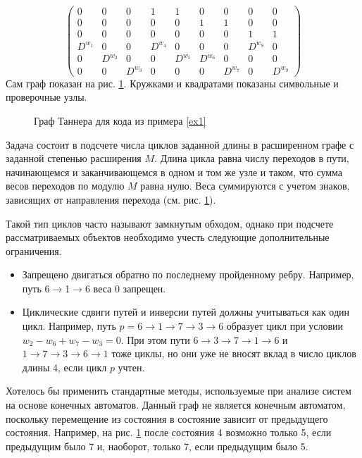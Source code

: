 \begin{example}
\[\begin{pmatrix}
0   &        0 &  0& 1 &1 & 0 &   0 &  0 &  0 \\
0   &        0 &  0& 0&0 & 1 &   1 &  0 &  0 \\
0   &        0 &  0& 0 &0 & 0 &   0 &  1 &  1 \\
D^{w_{1}}&   0   &  0  & D^{w_{4}}&0 &  0 & 0                   &   D^{w_{8}} & 0\\
0          &D^{w_{2}} &0  &0&D^{w_{5}}&  D^{w_{6}}          & 0          & 0&0\\
0 & 0& D^{w_{3}}      &0         &0      &  0   &  D^{w_{7}}& 0 &D^{w_{9}}
\end{pmatrix}                                                                                                                                           
\]
Сам граф показан на рис. \ref{fig1}. 
Кружками и квадратами показаны символьные и проверочные узлы. 
\begin{figure}[!h]
  \centering
   \caption{Граф Таннера для кода из примера \ref{ex1}}
  \label{fig1}
\end{figure}

\end{example}

Задача состоит в подсчете числа циклов заданной длины в расширенном 
графе с заданной степенью расширения $M$. Длина цикла равна числу переходов в 
пути, начинающемся и заканчивающемся  в одном и том же узле и таком, что 
сумма весов переходов по модулю $M$ равна нулю. 
Веса суммируются с учетом знаков, зависящих от направления 
перехода (см. рис. \ref{fig1}).

Такой тип циклов часто называют замкнутым обходом, однако при подсчете
рассматриваемых объектов необходимо учесть следующие дополнительные ограничения.
\begin{itemize}
\item
Запрещено двигаться обратно по последнему пройденному ребру. Например,
путь  6$\to$1$\to$6 веса 0 запрещен.
\item
Циклические сдвиги путей и инверсии путей должны  учитываться как один цикл. Например, путь
$p=6\to 1 \to 7\to 3 \to 6$  образует цикл при условии $w_2-w_6+w_7-w_3=0$. При этом пути
$6 \to 3 \to 7\to 1 \to 6$ и  $1\to 7 \to 3\to 6 \to 1$ тоже циклы, но они уже не вносят
вклад в число циклов длины 4,
если цикл $p$ учтен. 
\end{itemize}

Хотелось бы применить стандартные методы, используемые при анализе систем на основе 
конечных автоматов. Данный граф не является конечным автоматом, поскольку перемещение
из состояния в состояние зависит от предыдущего состояния.  Например, на рис. \ref{fig1}
после состояния 4 возможно только 5, если предыдущим было 7 и, наоборот,
только 7, если предыдущим было 5. 

